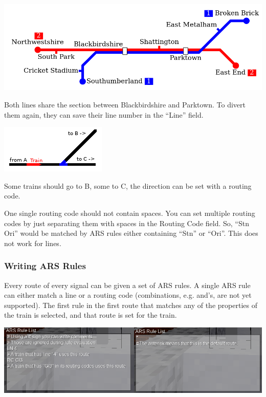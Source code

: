 \documentclass[english]{paper}
\begin{document}
\includegraphics{11_home_moritz_Home_Projekte_Minetest_minetest_mods_advtrains_assets_lyx_img_arslin_ex1.png}

Both lines share the section between Blackbirdshire and Parktown.
To divert them again, they can save their line number in the ``Line''
field.

\includegraphics{12_home_moritz_Home_Projekte_Minetest_minetest_mods_advtrains_assets_lyx_img_arslin_ex2.png}

Some trains should go to B, some to C, the direction can be set with
a routing code.

One single routing code should not contain spaces. You can set multiple
routing codes by just separating them with spaces in the Routing Code
field. So, ``Stn Ori'' would be matched by ARS rules either containing
``Stn'' or ``Ori''. This does not work for lines.

\subsubsection{Writing ARS Rules}

Every route of every signal can be given a set of ARS rules. A single
ARS rule can either match a line or a routing code (combinations,
e.g. and's, are not yet supported). The first rule in the first route
that matches any of the properties of the train is selected, and that
route is set for the train.

\includegraphics{13_home_moritz_Home_Projekte_Minetest_minetest_mods_advtrains_assets_lyx_img_ars_ex1.png}
\end{document}
